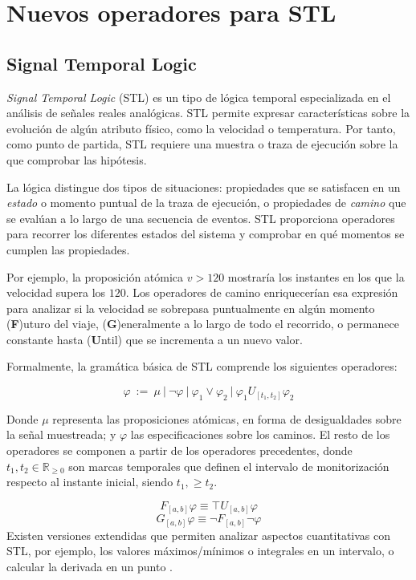 \chapter{Nuevos operadores para STL}
\label{cha:stl}

\section{Signal Temporal Logic}
\textit{Signal Temporal Logic} (STL) \cite{STL} es un tipo de lógica temporal especializada en el análisis de señales reales analógicas. STL permite expresar características sobre la evolución de algún atributo físico, como la velocidad o temperatura. Por tanto, como punto de partida, STL requiere una muestra o traza de ejecución sobre la que comprobar las hipótesis.

La lógica distingue dos tipos de situaciones: propiedades que se satisfacen en un \textit{estado} o momento puntual de la traza de ejecución, o propiedades de \textit{camino} que se evalúan a lo largo de una secuencia de eventos. STL proporciona operadores para recorrer los diferentes estados del sistema y comprobar en qué momentos se cumplen las propiedades.

Por ejemplo, la proposición atómica $v > 120$ mostraría los instantes en los que la velocidad supera los $120$. Los operadores de camino enriquecerían esa expresión para analizar si la velocidad se sobrepasa puntualmente en algún momento (\textbf{F})uturo del viaje, (\textbf{G})eneralmente a lo largo de todo el recorrido, o permanece constante hasta (\textbf{U}ntil) que se incrementa a un nuevo valor. 

Formalmente, la gramática básica de STL comprende los siguientes operadores:

$$ \varphi \ := \ \mu \ |\ \neg \varphi \ |\ \varphi_{1} \lor \varphi_{2} \ |\ \varphi_{1} U_{[t_1, t_2]} \varphi_{2}$$

Donde $\mu$ representa las proposiciones atómicas, en forma de desigualdades sobre la señal muestreada; y $\varphi$ las especificaciones sobre los caminos. El resto de los operadores se componen a partir de los operadores precedentes, donde $t_1, t_2 \in \mathbb{R}_{\geq 0}$ son marcas temporales que definen el intervalo de monitorización respecto al instante inicial, siendo $t_1,  \geq t_2$. 


$$ F_{[a,b]} \varphi \equiv \top U_{[a,b]} \varphi $$
$$ G_{[a,b]} \varphi \equiv \neg F_{[a,b]} \neg \varphi $$
Existen versiones extendidas que permiten analizar aspectos cuantitativas con STL, por ejemplo, los valores máximos/mínimos \cite{TACAS_19} o integrales en un intervalo, o calcular la derivada en un punto \cite{Stl_Der_Int}.


